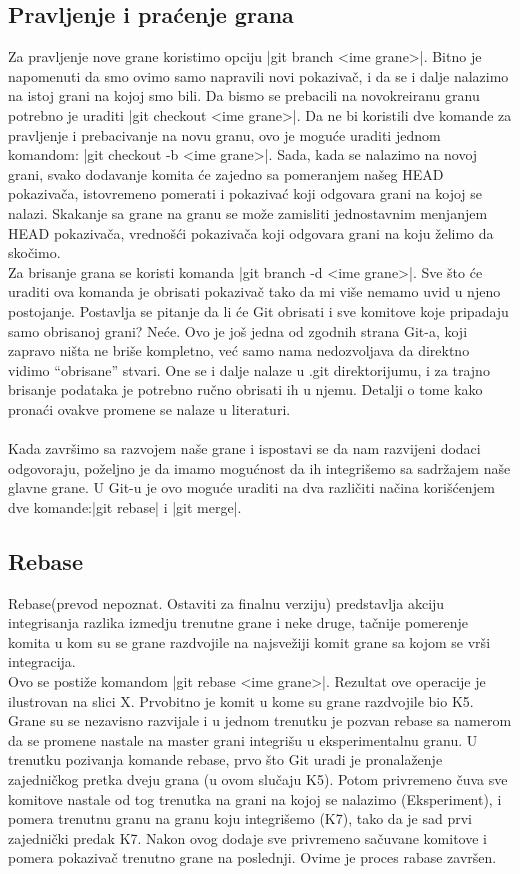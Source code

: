 \documentclass[a4paper]{article}
\begin{document}
{\subsection{Pravljenje i praćenje grana}
\label{subsec:pravljenje_grana}
Za pravljenje nove grane koristimo opciju |git branch <ime grane>|. Bitno je napomenuti da smo ovimo samo napravili novi pokazivač, i da se i dalje nalazimo na istoj grani na kojoj smo bili. Da bismo se prebacili na novokreiranu granu potrebno je uraditi |git checkout <ime grane>|. Da ne bi koristili dve komande za pravljenje i prebacivanje na novu granu, ovo je moguće uraditi jednom komandom: |git checkout -b <ime grane>|. 
Sada, kada se nalazimo na novoj grani, svako dodavanje komita će zajedno sa pomeranjem našeg HEAD pokazivača, istovremeno pomerati i pokazivać koji odgovara grani na kojoj se nalazi. Skakanje sa grane na granu se može zamisliti jednostavnim menjanjem HEAD pokazivača, vrednošći pokazivača koji odgovara grani na koju želimo da skočimo.\\
Za brisanje grana se koristi komanda |git branch -d <ime grane>|. Sve što će uraditi ova komanda je obrisati pokazivač tako da mi više nemamo uvid u njeno postojanje. Postavlja se pitanje da li će Git obrisati i sve komitove koje pripadaju samo obrisanoj grani? Neće. Ovo je još jedna od zgodnih strana Git-a, koji zapravo ništa ne briše kompletno, već samo nama nedozvoljava da direktno vidimo ``obrisane'' stvari. One se i dalje nalaze u .git direktorijumu, i za trajno brisanje podataka je potrebno ručno obrisati ih u njemu. Detalji o tome kako pronaći ovakve promene se nalaze u literaturi.\\\\
Kada završimo sa razvojem naše grane i ispostavi se da nam razvijeni dodaci odgovoraju, poželjno je da imamo mogućnost da ih integrišemo sa sadržajem naše glavne grane. U Git-u je ovo moguće uraditi na dva različiti načina korišćenjem dve komande:|git rebase| i |git merge|.  

\subsection{Rebase}
\label{subsec:rebase}
Rebase(prevod nepoznat. Ostaviti za finalnu verziju) predstavlja akciju integrisanja razlika izmedju trenutne grane i neke druge, tačnije pomerenje komita u kom su se grane razdvojile na najsvežiji komit grane sa kojom se vrši integracija.\\
Ovo se postiže komandom |git rebase <ime grane>|. Rezultat ove operacije je ilustrovan na slici X. Prvobitno je komit u kome su grane razdvojile bio K5. Grane su se nezavisno razvijale i u jednom trenutku je pozvan rebase sa namerom da se promene nastale na master grani integrišu u eksperimentalnu granu. U trenutku pozivanja komande rebase, prvo što Git uradi je pronalaženje zajedničkog pretka dveju grana (u ovom slučaju K5). Potom privremeno čuva sve komitove nastale od tog trenutka na grani na kojoj se nalazimo (Eksperiment), i pomera trenutnu granu na granu koju integrišemo (K7), tako da je sad prvi zajednički predak K7. Nakon ovog dodaje sve privremeno sačuvane komitove i pomera pokazivač trenutno grane na poslednji. Ovime je proces rabase završen.

}
\end{document}

